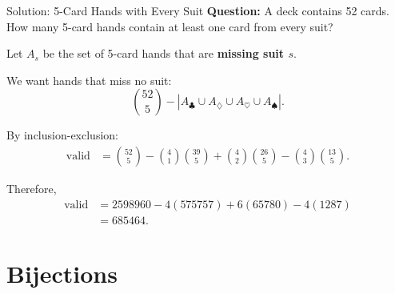 \begin{frame}{Solution: 5-Card Hands with Every Suit}
  \textcolor{sqt-question}{
    \textbf{Question:}
    A deck contains 52 cards. How many 5-card hands contain at least one card from every suit?
  }

  \vspace{0.4em}

  Let \(A_s\) be the set of 5-card hands that are \textbf{missing suit \(s\)}.

  \vspace{0.3em}

  We want hands that miss no suit:
  \[
    \binom{52}{5} - \left|A_{\clubsuit}\cup A_{\diamondsuit}\cup A_{\heartsuit}\cup A_{\spadesuit}\right|.
  \]

  \vspace{0.3em}

  By inclusion-exclusion:
  \[
  \begin{aligned}
    \text{valid}
    &=
    \binom{52}{5}
    - \binom{4}{1}\binom{39}{5}
    + \binom{4}{2}\binom{26}{5}
    - \binom{4}{3}\binom{13}{5}.
  \end{aligned}
  \]

  \vspace{0.3em}

  Therefore,
  \[
  \begin{aligned}
    \text{valid}
    &=
    2598960
    -4(575757)
    +6(65780)
    -4(1287) \\
    &= \boxed{685464}.
  \end{aligned}
  \]
\end{frame}

\section{Bijections}

